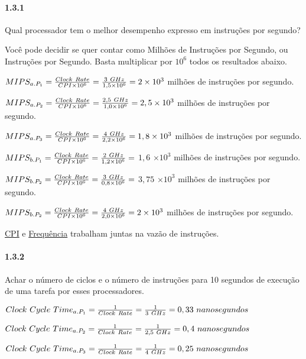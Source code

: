 \documentclass{article}
\begin{document}
\paragraph{1.3.1} Qual processador tem o melhor desempenho expresso em 
instruções por segundo?

Você pode decidir se quer contar como Milhões de Instruções por Segundo, ou 
Instruções por Segundo. Basta multiplicar por $10^{6}$ todos os resultados 
abaixo.

$MIPS_{a.P_{1}} = \frac{Clock\ Rate}{CPI \times 10^{6}} = \frac{3\ 
\small{GHz}}{1,5 \times 10^{6}} = 2 \times 10^{3}$ milhões de instruções por 
segundo.

$MIPS_{a.P_{2}} = \frac{Clock\ Rate}{CPI \times 10^{6}} = \frac{2,5\ 
\small{GHz}}{1,0 \times 10^{6}} = 2,5 \times 10^{3}$ milhões de instruções por 
segundo.

$MIPS_{a.P_{3}} = \frac{Clock\ Rate}{CPI \times 10^{6}} = \frac{4\ 
\small{GHz}}{2,2 \times 10^{6}} = 1,8 \times 10^{3}$ milhões de instruções por 
segundo.

$MIPS_{b.P_{1}} = \frac{Clock\ Rate}{CPI \times 10^{6}} = \frac{2\ 
\small{GHz}}{1,2 \times 10^{6}} =$ {\color{Red} $1,6$} $\times 10^{3}$ milhões 
de instruções por segundo.

$MIPS_{b.P_{2}} = \frac{Clock\ Rate}{CPI \times 10^{6}} = \frac{3\ 
\small{GHz}}{0,8 \times 10^{6}} =$ {\color{Blue} $3,75$} $\times 10^{3}$ 
milhões de instruções por segundo.

$MIPS_{b.P_{2}} = \frac{Clock\ Rate}{CPI \times 10^{6}} = \frac{4\ 
\small{GHz}}{2,0 \times 10^{6}} = 2 \times 10^{3}$ milhões de instruções por 
segundo.

\underline{CPI} e \underline{Frequência} trabalham juntas na vazão de 
instruções.

\paragraph{1.3.2} Achar o número de ciclos e o número de instruções para 10 
segundos de execução de uma tarefa por esses processadores.

$Clock\ Cycle\ Time_{a.P_{1}} = \frac{1}{Clock\ Rate} = \frac{1}{3\ 
\small{GHz}} = 0,33\ nanosegundos$

$Clock\ Cycle\ Time_{a.P_{2}} = \frac{1}{Clock\ Rate} = \frac{1}{2,5\ 
\small{GHz}} = 0,4\ nanosegundos$

$Clock\ Cycle\ Time_{a.P_{3}} = \frac{1}{Clock\ Rate} = \frac{1}{4\ 
\small{GHz}} = 0,25\ nanosegundos$
\end{document}
